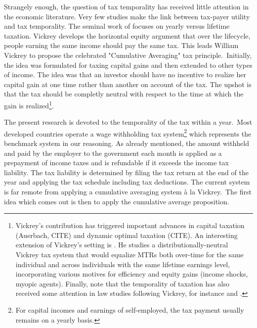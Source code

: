 Strangely enough, the question of tax temporality has received little
attention in the economic literature. Very few studies make the link between
tax-payer utility and tax temporality. The seminal work of \citet
{vickrey1939averaging} focuses on yearly versus lifetime taxation. Vickrey
develops the horizontal equity argument that over the lifecycle, people
earning the same income should pay the same tax. This leads William Vickrey to
propose the celebrated "Cumulative Averaging" tax principle.\ Initially, the
idea was formulated for taxing capital gains and then extended to other types
of income. The idea was that an investor should have no incentive to realize
her capital gain at one time rather than another on account of the tax. The
upshot is that the tax should be completly neutral with respect to the time at
which the gain is realized\footnote{Vickrey's contribution has triggered
important advances in capital taxation (Auerbach, CITE) and dynamic optimal
taxation (CITE). An interesting extension of Vickrey's setting is
\citet {liebman2002should}. He studies a distributionally-neutral Vickrey tax
system that would equalize MTRs both over-time for the same individual and
across individuals with the same lifetime earnings level, incorporating
various motives for efficiency and equity gains (income shocks, myopic
agents). Finally, note that the temporality of taxation has also received some
attention in law studies following Vickrey, for instance
\citet {batchelder2003taxing} and \citet
{fennell2005taxation}.}.\ 

The present research is devoted to the temporality of the tax within a
year.\ Most developed countries operate a wage withholding tax
system\footnote{For capital incomes and earnings of self-employed, the tax
payment usually remains on a yearly basis.} which represents the benchmark
system in our reasoning. As already mentioned, the amount withheld and paid by
the employer to the government each month is applied as a prepayment of income
taxes and is refundable if it exceeds the income tax liability. The tax
liability is determined by filing the tax return at the end of the year and
applying the tax schedule including tax deductions. The current system is far
remote from applying a cumulative averaging system \`{a} la Vickrey.\ The
first idea which comes out is then to apply the cumulative average proposition.\ 

